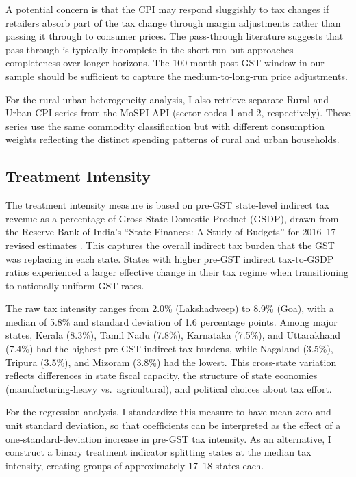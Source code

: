 \documentclass[12pt]{article}
\begin{document}
A potential concern is that the CPI may respond sluggishly to tax changes if retailers absorb part of the tax change through margin adjustments rather than passing it through to consumer prices. The pass-through literature \citep{chetty2009salience, gopinath2011currency} suggests that pass-through is typically incomplete in the short run but approaches completeness over longer horizons. The 100-month post-GST window in our sample should be sufficient to capture the medium-to-long-run price adjustments.

For the rural-urban heterogeneity analysis, I also retrieve separate Rural and Urban CPI series from the MoSPI API (sector codes 1 and 2, respectively). These series use the same commodity classification but with different consumption weights reflecting the distinct spending patterns of rural and urban households.

\subsection{Treatment Intensity}

The treatment intensity measure is based on pre-GST state-level indirect tax revenue as a percentage of Gross State Domestic Product (GSDP), drawn from the Reserve Bank of India's ``State Finances: A Study of Budgets'' for 2016--17 revised estimates \citep{rbi2018state}. This captures the overall indirect tax burden that the GST was replacing in each state. States with higher pre-GST indirect tax-to-GSDP ratios experienced a larger effective change in their tax regime when transitioning to nationally uniform GST rates.

The raw tax intensity ranges from 2.0\% (Lakshadweep) to 8.9\% (Goa), with a median of 5.8\% and standard deviation of 1.6 percentage points. Among major states, Kerala (8.3\%), Tamil Nadu (7.8\%), Karnataka (7.5\%), and Uttarakhand (7.4\%) had the highest pre-GST indirect tax burdens, while Nagaland (3.5\%), Tripura (3.5\%), and Mizoram (3.8\%) had the lowest. This cross-state variation reflects differences in state fiscal capacity, the structure of state economies (manufacturing-heavy vs.\ agricultural), and political choices about tax effort.

For the regression analysis, I standardize this measure to have mean zero and unit standard deviation, so that coefficients can be interpreted as the effect of a one-standard-deviation increase in pre-GST tax intensity. As an alternative, I construct a binary treatment indicator splitting states at the median tax intensity, creating groups of approximately 17--18 states each.
\end{document}
